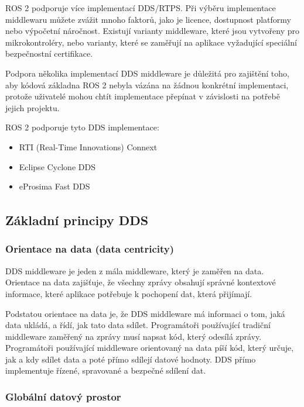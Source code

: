 ROS 2 podporuje více implementací \acs{DDS}/RTPS. Při výběru implementace middlewaru můžete zvážit mnoho faktorů, jako je licence, dostupnost platformy nebo výpočetní náročnost. Existují varianty middleware, které jsou vytvořeny pro mikrokontroléry, nebo varianty, které se zaměřují na aplikace vyžadující speciální bezpečnostní certifikace.

Podpora několika implementací \acs{DDS} middleware je důležitá pro zajištění toho, aby kódová základna ROS 2 nebyla vázána na žádnou konkrétní implementaci, protože uživatelé mohou chtít implementace přepínat v závislosti na potřebě jejich projektu. \cite{ROS2DDS2}

ROS 2 podporuje tyto \acs{DDS} implementace:
\begin{itemize}
    \item RTI (Real-Time Innovations) Connext
    \item Eclipse Cyclone DDS
    \item eProsima Fast DDS
\end{itemize}

\subsection{Základní principy DDS\texorpdfstring{\textsuperscript{\textregistered}}{ (R)}}
\subsubsection{Orientace na data (data centricity)}

\acs{DDS} middleware je jeden z mála middleware, který je zaměřen na data. Orientace na data zajišťuje, že všechny zprávy obsahují správné kontextové informace, které aplikace potřebuje k pochopení dat, která přijímají.

Podstatou orientace na data je, že \acs{DDS} middleware má informaci o tom, jaká data ukládá, a řídí, jak tato data sdílet. Programátoři používající tradiční middleware zaměřený na zprávy musí napsat kód, který odesílá zprávy. Programátoři používající middleware orientovaný na data píší kód, který určuje, jak a kdy sdílet data a poté přímo sdílejí datové hodnoty. \acs{DDS} přímo implementuje řízené, spravované a bezpečné sdílení dat. \cite{DDS_Main}

\subsubsection{Globální datový prostor}

